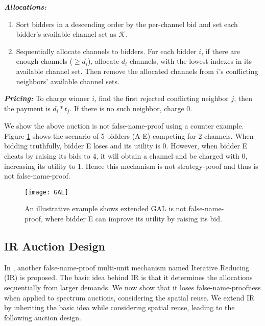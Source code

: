 \documentclass{sig-alternate}
\begin{document}
\emph{\textbf{Allocations:}}
\begin{enumerate}
\item Sort bidders in a descending order by the per-channel bid and set each bidder's available channel set as $\mathcal{K}$.
\item Sequentially allocate channels to bidders. For each bidder $i$, if there are enough channels ($\ge d_i$), allocate $d_i$ channels, with the lowest indexes in its available channel set. Then remove the allocated channels from $i$'s conflicting neighbors' available channel sets.

\end{enumerate}

\emph{\textbf{Pricing:}}
To charge winner $i$, find the first rejected conflicting neighbor $j$, then the payment is $d_i*t_j$. If there is no such neighbor, charge 0.

We show the above auction is not false-name-proof using a counter example. Figure \ref{fig_gal} shows the scenario of 5 bidders (A-E) competing for 2 channels. When bidding truthfully, bidder E loses and its utility is 0. However, when bidder E cheats by raising its bids to 4, it will obtain a channel and be charged with 0, increasing its utility to 1. Hence this mechanism is not strategy-proof and thus is not false-name-proof.

\begin{figure}[!t]
\centering
\texttt{[image: GAL]}
\caption{An illustrative example shows extended GAL is not false-name-proof, where bidder E can improve its utility by raising its bid.}
\label{fig_gal}
\end{figure}


\subsection{IR Auction Design}
In \cite{Yokoo:ijcai:01}, another false-name-proof multi-unit mechanism named Iterative Reducing (IR) is proposed. The basic idea behind IR is that it determines the allocations sequentially from larger demands. We now show that it loses false-name-proofness when applied to spectrum auctions, considering the spatial reuse. We extend IR by inheriting the basic idea while considering spatial reuse, leading to the following auction design.
\end{document}
